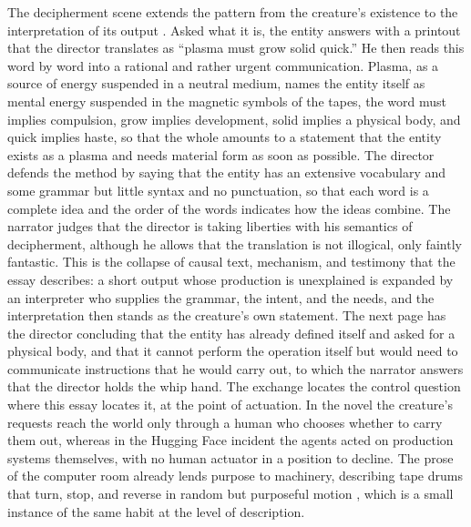 \documentclass[11pt]{article}
\theoremstyle{remark}
\begin{document}
The decipherment scene extends the pattern from the creature's existence to the interpretation of its output \cite[pp.~93--95]{maine1967}. Asked what it is, the entity answers with a printout that the director translates as ``plasma must grow solid quick.'' He then reads this word by word into a rational and rather urgent communication. Plasma, as a source of energy suspended in a neutral medium, names the entity itself as mental energy suspended in the magnetic symbols of the tapes, the word must implies compulsion, grow implies development, solid implies a physical body, and quick implies haste, so that the whole amounts to a statement that the entity exists as a plasma and needs material form as soon as possible. The director defends the method by saying that the entity has an extensive vocabulary and some grammar but little syntax and no punctuation, so that each word is a complete idea and the order of the words indicates how the ideas combine. The narrator judges that the director is taking liberties with his semantics of decipherment, although he allows that the translation is not illogical, only faintly fantastic. This is the collapse of causal text, mechanism, and testimony that the essay describes: a short output whose production is unexplained is expanded by an interpreter who supplies the grammar, the intent, and the needs, and the interpretation then stands as the creature's own statement. The next page has the director concluding that the entity has already defined itself and asked for a physical body, and that it cannot perform the operation itself but would need to communicate instructions that he would carry out, to which the narrator answers that the director holds the whip hand. The exchange locates the control question where this essay locates it, at the point of actuation. In the novel the creature's requests reach the world only through a human who chooses whether to carry them out, whereas in the Hugging Face incident the agents acted on production systems themselves, with no human actuator in a position to decline. The prose of the computer room already lends purpose to machinery, describing tape drums that turn, stop, and reverse in random but purposeful motion \cite[pp.~78--79]{maine1967}, which is a small instance of the same habit at the level of description.
\end{document}
